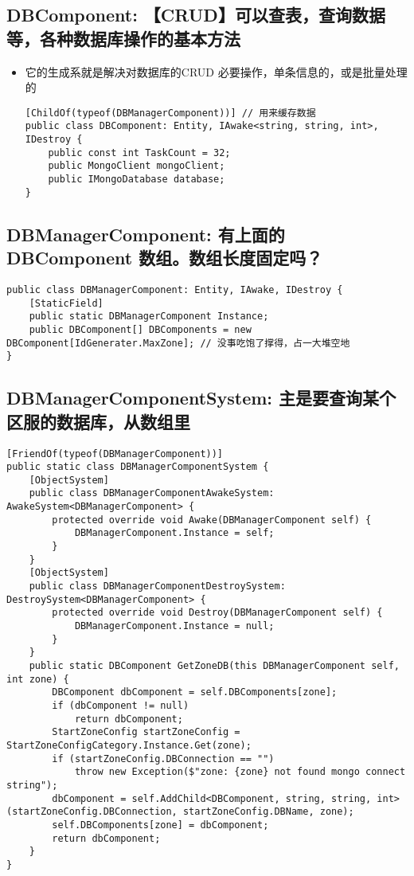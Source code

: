 \documentclass[9pt, b5paper]{article}
\begin{document}
\subsection{DBComponent: 【CRUD】可以查表，查询数据等，各种数据库操作的基本方法}
\label{sec-5-2}
\begin{itemize}
\item 它的生成系就是解决对数据库的CRUD 必要操作，单条信息的，或是批量处理的
\begin{verbatim}
[ChildOf(typeof(DBManagerComponent))] // 用来缓存数据
public class DBComponent: Entity, IAwake<string, string, int>, IDestroy {
    public const int TaskCount = 32;
    public MongoClient mongoClient;
    public IMongoDatabase database;
}
\end{verbatim}
\end{itemize}
\subsection{DBManagerComponent: 有上面的 DBComponent 数组。数组长度固定吗？}
\label{sec-5-3}
\begin{verbatim}
public class DBManagerComponent: Entity, IAwake, IDestroy {
    [StaticField]
    public static DBManagerComponent Instance;
    public DBComponent[] DBComponents = new DBComponent[IdGenerater.MaxZone]; // 没事吃饱了撑得，占一大堆空地
}
\end{verbatim}
\subsection{DBManagerComponentSystem: 主是要查询某个区服的数据库，从数组里}
\label{sec-5-4}
\begin{verbatim}
[FriendOf(typeof(DBManagerComponent))]
public static class DBManagerComponentSystem {
    [ObjectSystem]
    public class DBManagerComponentAwakeSystem: AwakeSystem<DBManagerComponent> {
        protected override void Awake(DBManagerComponent self) {
            DBManagerComponent.Instance = self;
        }
    }
    [ObjectSystem]
    public class DBManagerComponentDestroySystem: DestroySystem<DBManagerComponent> {
        protected override void Destroy(DBManagerComponent self) {
            DBManagerComponent.Instance = null;
        }
    }
    public static DBComponent GetZoneDB(this DBManagerComponent self, int zone) {
        DBComponent dbComponent = self.DBComponents[zone];
        if (dbComponent != null) 
            return dbComponent;
        StartZoneConfig startZoneConfig = StartZoneConfigCategory.Instance.Get(zone);
        if (startZoneConfig.DBConnection == "") 
            throw new Exception($"zone: {zone} not found mongo connect string");
        dbComponent = self.AddChild<DBComponent, string, string, int>(startZoneConfig.DBConnection, startZoneConfig.DBName, zone);
        self.DBComponents[zone] = dbComponent;
        return dbComponent;
    }
}
\end{verbatim}
\end{document}
